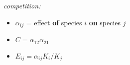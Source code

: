 \textsl{competition:}
\begin{itemize}
\item $\alpha_{ij}$ = effect \textbf{of} species $i$ \textbf{on} species $j$
\item $C = \alpha_{12}\alpha_{21}$
\item $E_{ij} = \alpha_{ij} K_i/K_j$
\end{itemize}
